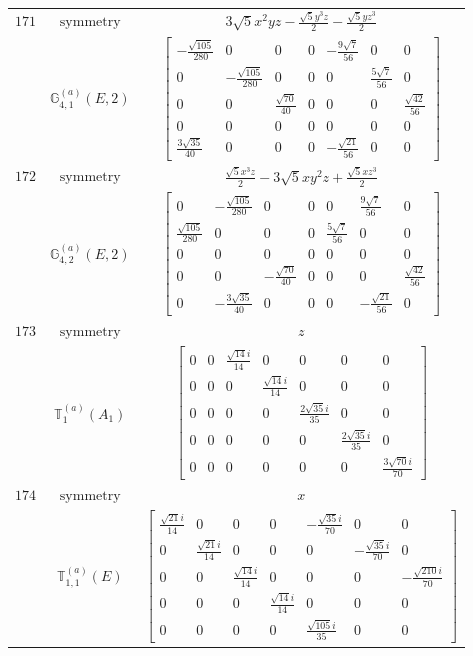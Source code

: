 \documentclass[fleqn,8pt,landscape]{jsarticle}
\begin{document}
\begin{longtable}{ccc}
$ 171 $ & $ \text{symmetry} $ & $ 3 \sqrt{5} x^{2} y z - \frac{\sqrt{5} y^{3} z}{2} - \frac{\sqrt{5} y z^{3}}{2} $ \\
$  $ & $ \mathbb{G}_{4,1}^{(a)}(E,2) $ & $ \begin{bmatrix} - \frac{\sqrt{105}}{280} & 0 & 0 & 0 & - \frac{9 \sqrt{7}}{56} & 0 & 0 \\ 0 & - \frac{\sqrt{105}}{280} & 0 & 0 & 0 & \frac{5 \sqrt{7}}{56} & 0 \\ 0 & 0 & \frac{\sqrt{70}}{40} & 0 & 0 & 0 & \frac{\sqrt{42}}{56} \\ 0 & 0 & 0 & 0 & 0 & 0 & 0 \\ \frac{3 \sqrt{35}}{40} & 0 & 0 & 0 & - \frac{\sqrt{21}}{56} & 0 & 0 \end{bmatrix} $ \\ \hline
$ 172 $ & $ \text{symmetry} $ & $ \frac{\sqrt{5} x^{3} z}{2} - 3 \sqrt{5} x y^{2} z + \frac{\sqrt{5} x z^{3}}{2} $ \\
$  $ & $ \mathbb{G}_{4,2}^{(a)}(E,2) $ & $ \begin{bmatrix} 0 & - \frac{\sqrt{105}}{280} & 0 & 0 & 0 & \frac{9 \sqrt{7}}{56} & 0 \\ \frac{\sqrt{105}}{280} & 0 & 0 & 0 & \frac{5 \sqrt{7}}{56} & 0 & 0 \\ 0 & 0 & 0 & 0 & 0 & 0 & 0 \\ 0 & 0 & - \frac{\sqrt{70}}{40} & 0 & 0 & 0 & \frac{\sqrt{42}}{56} \\ 0 & - \frac{3 \sqrt{35}}{40} & 0 & 0 & 0 & - \frac{\sqrt{21}}{56} & 0 \end{bmatrix} $ \\ \hline
$ 173 $ & $ \text{symmetry} $ & $ z $ \\
$  $ & $ \mathbb{T}_{1}^{(a)}(A_{1}) $ & $ \begin{bmatrix} 0 & 0 & \frac{\sqrt{14} i}{14} & 0 & 0 & 0 & 0 \\ 0 & 0 & 0 & \frac{\sqrt{14} i}{14} & 0 & 0 & 0 \\ 0 & 0 & 0 & 0 & \frac{2 \sqrt{35} i}{35} & 0 & 0 \\ 0 & 0 & 0 & 0 & 0 & \frac{2 \sqrt{35} i}{35} & 0 \\ 0 & 0 & 0 & 0 & 0 & 0 & \frac{3 \sqrt{70} i}{70} \end{bmatrix} $ \\ \hline
$ 174 $ & $ \text{symmetry} $ & $ x $ \\
$  $ & $ \mathbb{T}_{1,1}^{(a)}(E) $ & $ \begin{bmatrix} \frac{\sqrt{21} i}{14} & 0 & 0 & 0 & - \frac{\sqrt{35} i}{70} & 0 & 0 \\ 0 & \frac{\sqrt{21} i}{14} & 0 & 0 & 0 & - \frac{\sqrt{35} i}{70} & 0 \\ 0 & 0 & \frac{\sqrt{14} i}{14} & 0 & 0 & 0 & - \frac{\sqrt{210} i}{70} \\ 0 & 0 & 0 & \frac{\sqrt{14} i}{14} & 0 & 0 & 0 \\ 0 & 0 & 0 & 0 & \frac{\sqrt{105} i}{35} & 0 & 0 \end{bmatrix} $ \\ \hline

\end{longtable}
\end{document}
